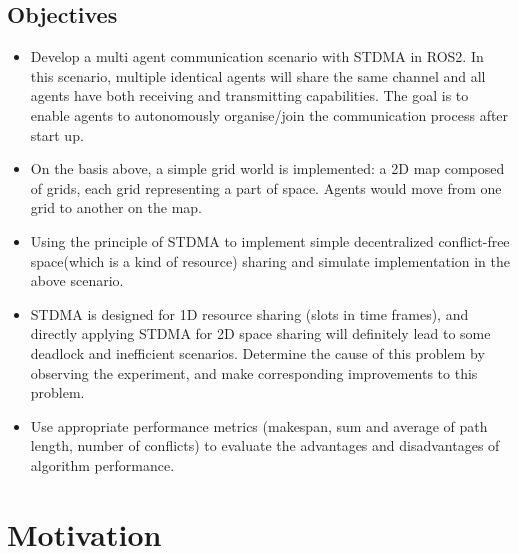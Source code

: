 \documentclass[12pt, oneside]{article}
\begin{document}
\subsection{Objectives}
\label{Objectives}
\begin{itemize}
    \item Develop a multi agent communication scenario with STDMA in ROS2. In this scenario, multiple identical agents will share the same channel and all agents have both receiving and transmitting capabilities. The goal is to enable agents to autonomously organise/join the communication process after start up.
    \item On the basis above, a simple grid world is implemented: a 2D map composed of grids, each grid representing a part of space. Agents would move from one grid to another on the map.
    \item Using the principle of STDMA \cite{STDMA} to implement simple decentralized conflict-free space(which is a kind of resource) sharing and simulate implementation in the above scenario.
    \item STDMA is designed for 1D resource sharing (slots in time frames), and directly applying STDMA for 2D space sharing will definitely lead to some deadlock and inefficient scenarios\cite{MAPF_Deadlock_Explain1}\cite{MAPF_Deadlock_Explain2}. Determine the cause of this problem by observing the experiment, and make corresponding improvements to this problem. 
    \item Use appropriate performance metrics (makespan, sum and average of path length, number of conflicts) to evaluate the advantages and disadvantages of algorithm performance. 
\end{itemize}

\pagebreak

\section{Motivation}
\end{document}
